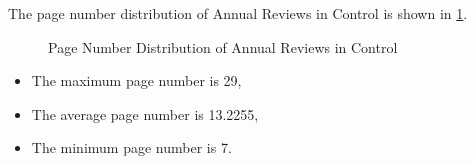 \documentclass[12pt,
               a4paper,
               journal,
               onecolumn]{IEEEtran}
\begin{document}
The page number distribution of Annual Reviews in Control is shown in \cref{fig:Page Number Distribution of Annual Reviews in Control}.
\begin{figure}[htb]
  \centering
  \caption{Page Number Distribution of Annual Reviews in Control}
  \label{fig:Page Number Distribution of Annual Reviews in Control}
\end{figure}

\begin{itemize}
  \item The maximum page number is 29,
  \item The average page number is 13.2255,
  \item The minimum page number is 7.
\end{itemize}
\end{document}
